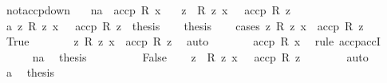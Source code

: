 \begin{isabellebody}
\endisatagproof
{\isafoldproof}%
%
\isadelimproof
\isanewline
%
\endisadelimproof
\isanewline
{}\isamarkupfalse%
\ not{\isacharunderscore}{\kern0pt}accp{\isacharunderscore}{\kern0pt}down{\isacharcolon}{\kern0pt}\isanewline
\ \ \ na{\isacharcolon}{\kern0pt}\ {\isachardoublequoteopen}{\isasymnot}\ accp\ R\ x{\isachardoublequoteclose}\isanewline
\ \ \ z\ \ {\isachardoublequoteopen}R\ z\ x{\isachardoublequoteclose}\ \ {\isachardoublequoteopen}{\isasymnot}\ accp\ R\ z{\isachardoublequoteclose}\isanewline
%
\isadelimproof
%
\endisadelimproof
%
\isatagproof
{}\isamarkupfalse%
\ {\isacharminus}{\kern0pt}\isanewline
\ \ \isamarkupfalse%
\ a{\isacharcolon}{\kern0pt}\ {\isachardoublequoteopen}{\isasymAnd}z{\isachardot}{\kern0pt}\ R\ z\ x\ {\isasymLongrightarrow}\ {\isasymnot}\ accp\ R\ z\ {\isasymLongrightarrow}\ thesis{\isachardoublequoteclose}\isanewline
\ \ \isamarkupfalse%
\ thesis\isanewline
\ \ \isamarkupfalse%
\ {\isacharparenleft}{\kern0pt}cases\ {\isachardoublequoteopen}{\isasymforall}z{\isachardot}{\kern0pt}\ R\ z\ x\ {\isasymlongrightarrow}\ accp\ R\ z{\isachardoublequoteclose}{\isacharparenright}{\kern0pt}\isanewline
\ \ \ \ \isamarkupfalse%
\ True\isanewline
\ \ \ \ \isamarkupfalse%
\ \isamarkupfalse%
\ {\isachardoublequoteopen}{\isasymAnd}z{\isachardot}{\kern0pt}\ R\ z\ x\ {\isasymLongrightarrow}\ accp\ R\ z{\isachardoublequoteclose}\ \isamarkupfalse%
\ auto\isanewline
\ \ \ \ \isamarkupfalse%
\ \isamarkupfalse%
\ {\isachardoublequoteopen}accp\ R\ x{\isachardoublequoteclose}\ \isamarkupfalse%
\ {\isacharparenleft}{\kern0pt}rule\ accp{\isachardot}{\kern0pt}accI{\isacharparenright}{\kern0pt}\isanewline
\ \ \ \ \isamarkupfalse%
\ na\ \isamarkupfalse%
\ thesis\ \isacommand{{\isachardot}{\kern0pt}{\isachardot}{\kern0pt}}\isamarkupfalse%
\isanewline
\ \ \isamarkupfalse%
\isanewline
\ \ \ \ \isamarkupfalse%
\ False\ \isamarkupfalse%
\ \isamarkupfalse%
\ z\ \ {\isachardoublequoteopen}R\ z\ x{\isachardoublequoteclose}\ \ {\isachardoublequoteopen}{\isasymnot}\ accp\ R\ z{\isachardoublequoteclose}\isanewline
\ \ \ \ \ \ \isamarkupfalse%
\ auto\isanewline
\ \ \ \ \isamarkupfalse%
\ a\ \isamarkupfalse%
\ thesis\ \isacommand{{\isachardot}{\kern0pt}}\isamarkupfalse%

\end{isabellebody}
